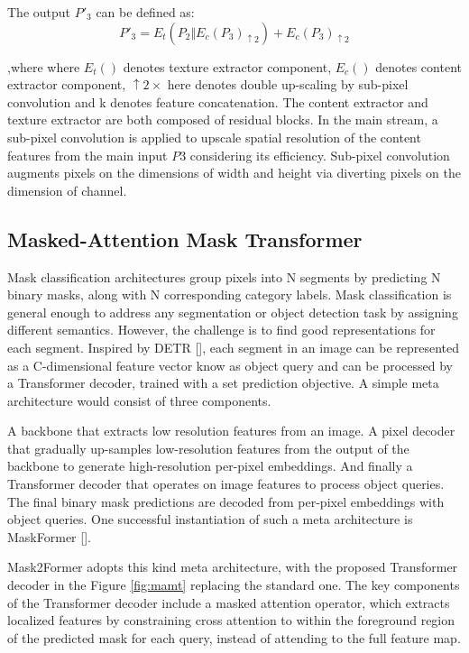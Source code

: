 \newpage
The output $P'_3$ can be defined as:
\[P'_3 = E_t(P_2 \Vert E_c(P_3)_{\uparrow 2}) + E_c(P_3)_{\uparrow 2}\]

,where where $E_t()$ denotes texture extractor component, $E_c()$ denotes content extractor component, $\uparrow 2\times$ here denotes double up-scaling by 
sub-pixel convolution and k denotes feature concatenation. The content extractor and texture extractor are both composed of residual blocks. In the main stream, 
a sub-pixel convolution is applied to upscale spatial resolution of the content features from the main input $P3$ considering its efficiency.
Sub-pixel convolution augments pixels on the dimensions of width and height via diverting pixels on the dimension of channel.


\subsection{Masked-Attention Mask Transformer} \label{mamt}

Mask classification architectures group pixels into N segments by predicting N binary masks, along with N corresponding category labels. 
Mask classification is general enough to address any segmentation or object detection task by assigning different semantics.
However, the  challenge is to find good representations for each segment. Inspired by DETR [], each segment in an image can be represented as a 
C-dimensional feature vector know as object query and can be processed by a Transformer decoder, trained with a set prediction objective. A simple meta 
architecture would consist of three components. 

A backbone that extracts low resolution features from an image. A pixel decoder that gradually up-samples low-resolution features from the output of the 
backbone to generate high-resolution per-pixel embeddings. And finally a Transformer decoder that operates on image features to process object queries. 
The final binary mask predictions are decoded from per-pixel embeddings with object queries. One successful instantiation of such a meta architecture is 
MaskFormer [].


Mask2Former adopts this kind meta architecture, with the proposed Transformer decoder in the Figure \ref{fig:mamt} replacing the standard one. The key 
components of the Transformer decoder include a masked attention operator, which extracts localized features by constraining cross attention to within the 
foreground region of the predicted mask for each query, instead of attending to the full feature map. 

